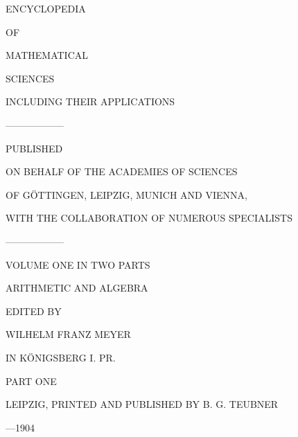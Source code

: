 \begin{center}
{\fontsize{24}{30}\selectfont ENCYCLOPEDIA}

\vspace{0.25cm}
{\fontsize{12}{30}\selectfont OF}

\vspace{0.25cm}
{\fontsize{24}{30}\selectfont MATHEMATICAL}

\vspace{0.5cm}
{\fontsize{24}{30}\selectfont SCIENCES}

\vspace{0.8cm}
{\fontsize{18}{24}\selectfont INCLUDING THEIR APPLICATIONS}

\vspace{0.25cm}
{\fontsize{12}{20}\selectfont ------------------}

\vspace{0.25cm}
{\fontsize{12}{20}\selectfont PUBLISHED}

\vspace{0.5cm}
{\fontsize{12}{20}\selectfont ON BEHALF OF THE ACADEMIES OF SCIENCES}

\vspace{0.3cm}
{\fontsize{12}{20}\selectfont OF GÖTTINGEN, LEIPZIG, MUNICH AND VIENNA,}

\vspace{0.3cm}
{\fontsize{12}{20}\selectfont WITH THE COLLABORATION OF NUMEROUS SPECIALISTS}

\vspace{0.25cm}
{\fontsize{12}{20}\selectfont ------------------}

\vspace{0.25cm}
{\fontsize{14}{24}\selectfont VOLUME ONE IN TWO PARTS}

\vspace{0.5cm}
{\fontsize{20}{26}\selectfont ARITHMETIC AND ALGEBRA}

\vspace{0.8cm}
{\fontsize{12}{20}\selectfont EDITED BY}

\vspace{0.5cm}
{\fontsize{18}{24}\selectfont WILHELM FRANZ MEYER}

\vspace{0.3cm}
{\fontsize{10}{20}\selectfont IN KÖNIGSBERG I. PR.}

\vspace{0.5cm}
{\fontsize{14}{24}\selectfont PART ONE}

\vspace{2cm}
{\fontsize{14}{20}\selectfont LEIPZIG, PRINTED AND PUBLISHED BY B. G. TEUBNER}

\vspace{0.5cm}
{\fontsize{16}{20}—1904}
\end{center}
